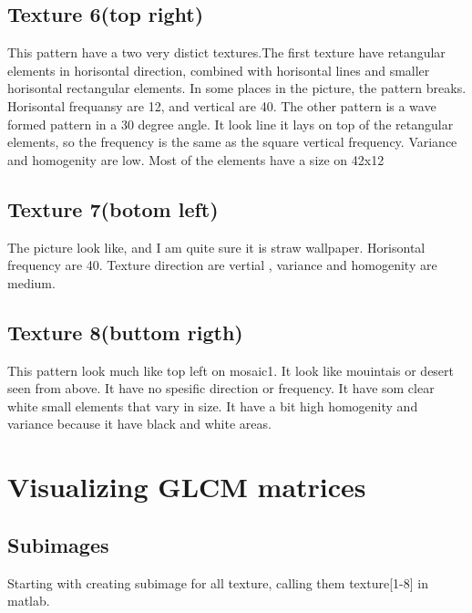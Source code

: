 \documentclass{article}
\begin{document}
\subsection{Texture 6(top right)}
This pattern have a two very distict textures.The first texture have retangular elements in horisontal direction, combined with horisontal lines and smaller horisontal rectangular elements. In some places in the picture, the pattern breaks. Horisontal frequansy are 12, and vertical are 40. The other pattern is a wave formed pattern in a 30 degree angle. It look line it lays on top of the retangular elements, so the frequency is the same as the square vertical frequency. Variance and homogenity are low. Most of the elements have a size on 42x12
\subsection{Texture 7(botom left)}
The picture look like, and I am quite sure it is straw wallpaper. Horisontal frequency are 40. Texture direction are vertial , variance and homogenity are medium.
\subsection{Texture 8(buttom rigth)}
This pattern look much like top left on mosaic1. It look like mouintais or desert seen from above. It have no spesific direction or frequency. It have som clear white small elements that vary in size. It have a bit high homogenity and variance because it have black and white areas. 

\section{Visualizing GLCM matrices}
\subsection{Subimages}
Starting with creating subimage for all texture, calling them texture[1-8] in matlab. 
\end{document}

